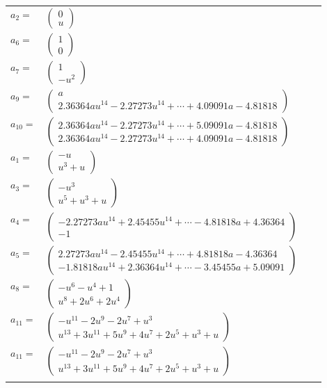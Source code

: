 \documentclass[1p]{elsarticle_modified}
\theoremstyle{definition}
\begin{document}
\begin{tabular}{m{7pt} m{180pt} m{7pt} m{180pt} }
\flushright $a_{2}=$&$\begin{pmatrix}0\\u\end{pmatrix}$ \\
\flushright $a_{6}=$&$\begin{pmatrix}1\\0\end{pmatrix}$ \\
\flushright $a_{7}=$&$\begin{pmatrix}1\\- u^2\end{pmatrix}$ \\
\flushright $a_{9}=$&$\begin{pmatrix}a\\2.36364 a u^{14}-2.27273 u^{14}+\cdots+4.09091 a-4.81818\end{pmatrix}$ \\
\flushright $a_{10}=$&$\begin{pmatrix}2.36364 a u^{14}-2.27273 u^{14}+\cdots+5.09091 a-4.81818\\2.36364 a u^{14}-2.27273 u^{14}+\cdots+4.09091 a-4.81818\end{pmatrix}$ \\
\flushright $a_{1}=$&$\begin{pmatrix}- u\\u^3+u\end{pmatrix}$ \\
\flushright $a_{3}=$&$\begin{pmatrix}- u^3\\u^5+u^3+u\end{pmatrix}$ \\
\flushright $a_{4}=$&$\begin{pmatrix}-2.27273 a u^{14}+2.45455 u^{14}+\cdots-4.81818 a+4.36364\\-1\end{pmatrix}$ \\
\flushright $a_{5}=$&$\begin{pmatrix}2.27273 a u^{14}-2.45455 u^{14}+\cdots+4.81818 a-4.36364\\-1.81818 a u^{14}+2.36364 u^{14}+\cdots-3.45455 a+5.09091\end{pmatrix}$ \\
\flushright $a_{8}=$&$\begin{pmatrix}- u^6- u^4+1\\u^8+2 u^6+2 u^4\end{pmatrix}$ \\
\flushright $a_{11}=$&$\begin{pmatrix}- u^{11}-2 u^9-2 u^7+u^3\\u^{13}+3 u^{11}+5 u^9+4 u^7+2 u^5+u^3+u\end{pmatrix}$\\ \flushright $a_{11}=$&$\begin{pmatrix}- u^{11}-2 u^9-2 u^7+u^3\\u^{13}+3 u^{11}+5 u^9+4 u^7+2 u^5+u^3+u\end{pmatrix}$\\&\end{tabular}
\end{document}

